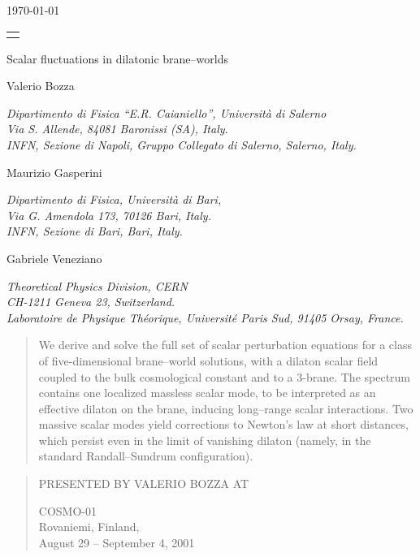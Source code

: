 \documentclass[a4paper,12pt]{article}
\providecommand{\pubdate}[1]{\begin{lrbox}{\sboxpubdate}{#1}\end{lrbox}}
\providecommand{\pubnumber}[1]{\begin{lrbox}{\sboxpubnumber}{\begin{tabular}{l} #1 \\
                 \usebox{\sboxpubdate}
                 \end{tabular}}
                           \end{lrbox}
                           \pubblock}
\providecommand{\Title}[1]{\begin{center} {\Large #1 } \end{center}}
\providecommand{\Author}[1]{\begin{center}{ \sc #1} \end{center}}
\providecommand{\Address}[1]{\begin{center}{ \it #1} \end{center}}
\providecommand{\pubblock}{\rightline{
            \usebox{\sboxpubnumber}}}
\newenvironment{Abstract}{\begin{quotation}  }{\end{quotation}}
\newenvironment{Presented}{\begin{quotation} \begin{center}
             PRESENTED BY VALERIO BOZZA AT\end{center}\bigskip
      \begin{center}\begin{large}}{\end{large}\end{center}
      \end{quotation}}
\begin{document}
\begin{titlepage}
\pubdate{\today}                    %
\pubnumber{} %

\vfill \Title{Scalar fluctuations in dilatonic brane--worlds}
\vfill \Author{Valerio Bozza}

\Address{Dipartimento di Fisica ``E.R. Caianiello'', Universit\`a
di Salerno \\
         Via S. Allende, 84081 Baronissi (SA), Italy. \\
       INFN, Sezione di
Napoli, Gruppo Collegato di Salerno, Salerno, Italy.}

\vspace{.25cm} \Author{Maurizio Gasperini} \Address{Dipartimento
di Fisica, Universit\`a di Bari, \\ Via G. Amendola 173, 70126
Bari, Italy.\\ INFN, Sezione di Bari, Bari, Italy.}

\vspace{.25cm} \Author{Gabriele Veneziano} \Address{Theoretical
Physics Division, CERN \\ CH-1211 Geneva 23, Switzerland.
\\Laboratoire de Physique Th\'eorique, Universit\'e Paris Sud,
91405 Orsay, France.} \vfill

\begin{Abstract}
We derive and solve the full set of scalar perturbation equations
for a class of five-dimensional brane--world solutions, with a dilaton
scalar field coupled to the bulk cosmological constant and to a 3-brane.
The spectrum contains one localized massless scalar mode, to be
interpreted as an effective dilaton on the brane, inducing  long--range
scalar interactions. Two massive scalar modes yield corrections to
Newton's law at short distances, which persist even in the limit of
vanishing dilaton (namely, in the standard Randall--Sundrum
configuration).
\end{Abstract}
\vfill
\begin{Presented}
    COSMO-01 \\
    Rovaniemi, Finland, \\
    August 29 -- September 4, 2001
\end{Presented}
\vfill
\end{titlepage}
\def\thefootnote{\fnsymbol{footnote}}
\setcounter{footnote}{0}
\end{document}
